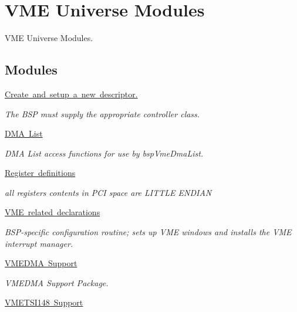 \hypertarget{group__shared__vmeuniverse}{}\section{V\+ME Universe Modules}
\label{group__shared__vmeuniverse}


V\+ME Universe Modules.  


\subsection*{Modules}
\begin{DoxyCompactItemize}
\item 
\mbox{\hyperlink{group__shared__bspvmedmalist}{Create and setup a new descriptor.}}
\begin{DoxyCompactList}\small\item\em The B\+SP must supply the appropriate controller class. \end{DoxyCompactList}\item 
\mbox{\hyperlink{group__shared__vmetsi148dma}{D\+M\+A List}}
\begin{DoxyCompactList}\small\item\em D\+MA List access functions for use by bsp\+Vme\+Dma\+List. \end{DoxyCompactList}\item 
\mbox{\hyperlink{group__shared__vmeuniverse__reg}{Register definitions}}
\begin{DoxyCompactList}\small\item\em all registers contents in P\+CI space are L\+I\+T\+T\+LE E\+N\+D\+I\+AN \end{DoxyCompactList}\item 
\mbox{\hyperlink{group__shared__vme}{V\+M\+E related declarations}}
\begin{DoxyCompactList}\small\item\em B\+S\+P-\/specific configuration routine; sets up V\+ME windows and installs the V\+ME interrupt manager. \end{DoxyCompactList}\item 
\mbox{\hyperlink{group__shared__vmedma}{V\+M\+E\+D\+M\+A Support}}
\begin{DoxyCompactList}\small\item\em V\+M\+E\+D\+MA Support Package. \end{DoxyCompactList}\item 
\mbox{\hyperlink{group__shared__vmetsi148}{V\+M\+E\+T\+S\+I148 Support}}

\end{DoxyCompactItemize}
